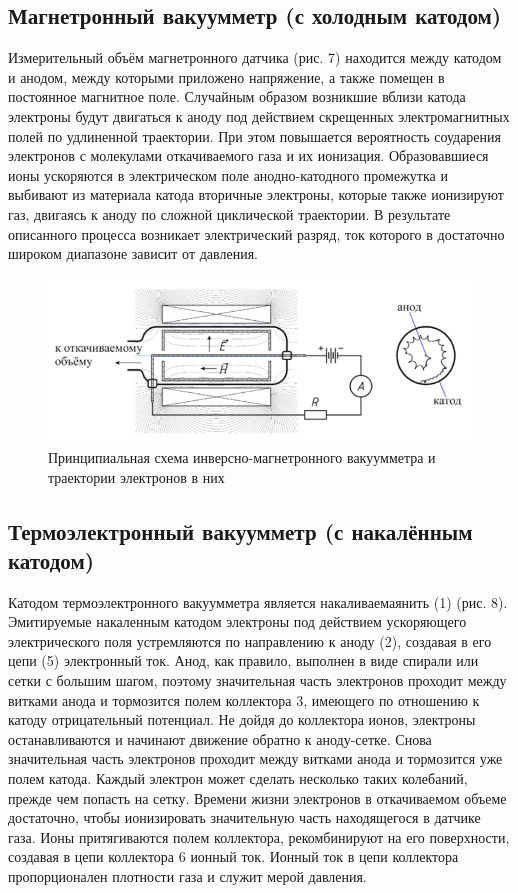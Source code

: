 \documentclass[14pt, a4paper]{report}
\begin{document}
\subsection{Магнетронный вакуумметр (с холодным катодом)}

Измерительный объём магнетронного датчика (рис. 7) находится между катодом и анодом, между которыми приложено напряжение, а также помещен в постоянное магнитное поле. Случайным образом возникшие вблизи катода электроны будут двигаться к аноду под действием скрещенных электромагнитных полей по удлиненной траектории. При этом повышается вероятность соударения электронов с молекулами откачиваемого газа и их ионизация. Образовавшиеся ионы ускоряются в электрическом поле анодно-катодного промежутка и выбивают из материала катода вторичные электроны, которые также ионизируют газ, двигаясь к аноду по сложной циклической траектории. В результате описанного процесса возникает электрический разряд, ток которого в достаточно широком диапазоне зависит от давления.

\begin{figure}[!ht]
\centering
\includegraphics[scale=0.5]{terma5_06.png}
\caption{Принципиальная схема инверсно-магнетронного вакуумметра и траектории электронов в них}
\end{figure}

\subsection{Термоэлектронный вакуумметр (с накалённым катодом)}

Катодом термоэлектронного вакуумметра является накаливаемаянить (1) (рис. 8). Эмитируемые накаленным катодом электроны под действием ускоряющего электрического поля устремляются по направлению к аноду (2), создавая в его цепи (5) электронный ток. Анод, как правило, выполнен в виде спирали или сетки с большим шагом, поэтому значительная часть электронов проходит между витками анода и тормозится полем коллектора 3, имеющего по отношению к катоду отрицательный потенциал. Не дойдя до коллектора ионов, электроны останавливаются и начинают движение обратно к аноду-сетке. Снова значительная часть электронов проходит между витками анода и тормозится уже полем катода. Каждый электрон может сделать несколько таких колебаний, прежде чем попасть на сетку. Времени жизни электронов в откачиваемом объеме достаточно, чтобы ионизировать значительную часть находящегося в датчике газа. Ионы притягиваются полем коллектора, рекомбинируют на его поверхности, создавая в цепи коллектора 6 ионный ток. Ионный ток в цепи коллектора пропорционален плотности газа и служит мерой давления.
\end{document}
